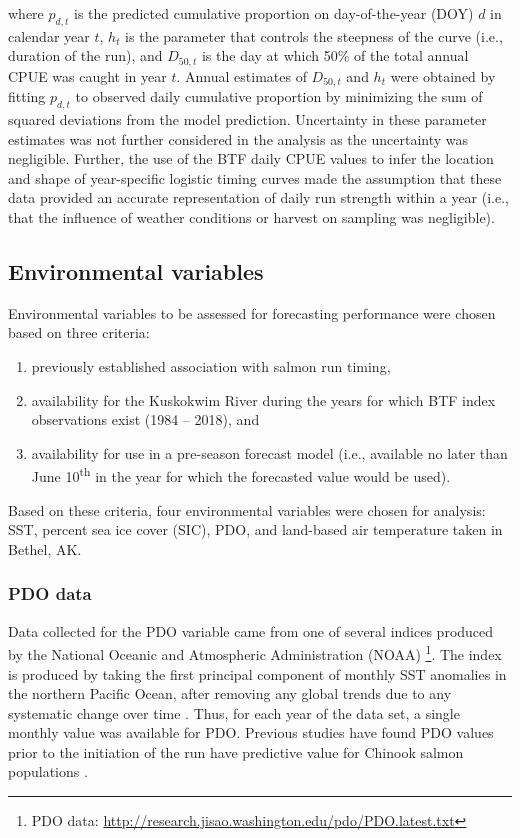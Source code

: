 \documentclass[12pt,]{book}
\providecommand{\tightlist}{%
  \setlength{\itemsep}{0pt}\setlength{\parskip}{0pt}}
\let\rmarkdownfootnote\footnote%
\def\footnote{\protect\rmarkdownfootnote}
\theoremstyle{definition}
\theoremstyle{definition}
\theoremstyle{definition}
\theoremstyle{remark}
\begin{document}
\noindent
where \(p_{d,t}\) is the predicted cumulative proportion on
day-of-the-year (DOY) \(d\) in calendar year \(t\), \(h_t\) is the
parameter that controls the steepness of the curve (i.e., duration of
the run), and \(D_{50,t}\) is the day at which 50\% of the total annual
CPUE was caught in year \(t\). Annual estimates of \(D_{50,t}\) and
\(h_t\) were obtained by fitting \(p_{d,t}\) to observed daily
cumulative proportion by minimizing the sum of squared deviations from
the model prediction. Uncertainty in these parameter estimates was not
further considered in the analysis as the uncertainty was negligible.
Further, the use of the BTF daily CPUE values to infer the location and
shape of year-specific logistic timing curves made the assumption that
these data provided an accurate representation of daily run strength
within a year (i.e., that the influence of weather conditions or harvest
on sampling was negligible).

\subsection{Environmental variables}\label{environmental-variables}

\noindent
Environmental variables to be assessed for forecasting performance were
chosen based on three criteria:

\begin{enumerate}
\def\labelenumi{(\arabic{enumi})}
\tightlist
\item
  previously established association with salmon run timing,
\item
  availability for the Kuskokwim River during the years for which BTF
  index observations exist (1984 -- 2018), and
\item
  availability for use in a pre-season forecast model (i.e., available
  no later than June 10\textsuperscript{th} in the year for which the
  forecasted value would be used).
\end{enumerate}

\noindent
Based on these criteria, four environmental variables were chosen for
analysis: SST, percent sea ice cover (SIC), PDO, and land-based air
temperature taken in Bethel, AK.

\subsubsection{PDO data}\label{pdo-data}

\noindent
Data collected for the PDO variable came from one of several indices
produced by the National Oceanic and Atmospheric Administration (NOAA)
\citep{mantua-etal-1997}\footnote{PDO data:
  \url{http://research.jisao.washington.edu/pdo/PDO.latest.txt}}. The
index is produced by taking the first principal component of monthly SST
anomalies in the northern Pacific Ocean, after removing any global
trends due to any systematic change over time \citep{mantua-etal-1997}.
Thus, for each year of the data set, a single monthly value was
available for PDO. Previous studies have found PDO values prior to the
initiation of the run have predictive value for Chinook salmon
populations \citep{beer-2007, keefer-etal-2008}.
\end{document}
